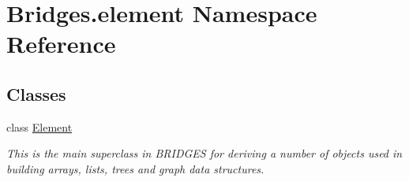 \hypertarget{namespace_bridges_1_1element}{}\section{Bridges.\+element Namespace Reference}
\label{namespace_bridges_1_1element}
\subsection*{Classes}
\begin{DoxyCompactItemize}
\item 
class \mbox{\hyperlink{class_bridges_1_1element_1_1_element}{Element}}
\begin{DoxyCompactList}\small\item\em This is the main superclass in B\+R\+I\+D\+G\+ES for deriving a number of objects used in building arrays, lists, trees and graph data structures. \end{DoxyCompactList}\end{DoxyCompactItemize}
